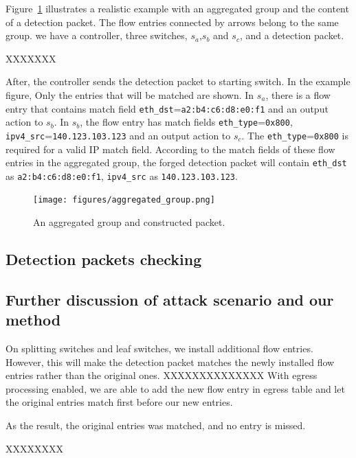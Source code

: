Figure~\ref{aggregated_group} illustrates a realistic example with an aggregated group and the content of a detection packet. The flow entries connected by arrows belong to the same group. we have a controller, three switches, $s_a$,$s_b$ and $s_c$, and a detection packet.

XXXXXXX


After, the controller sends the detection packet to starting switch. In the example figure,  Only the entries that will be matched are shown. In $s_a$, there is a flow entry that contains match field \texttt{eth\_dst}=\texttt{a2:b4:c6:d8:e0:f1} and an output action to $s_b$. In $s_b$, the flow entry has match fields \texttt{eth\_type}=\texttt{0x800}, \texttt{ipv4\_src}=\texttt{140.123.103.123} and an output action to $s_c$. The \texttt{eth\_type}=\texttt{0x800} is required for a valid IP match field. According to the match fields of these flow entries in the aggregated group, the forged detection packet will contain \texttt{eth\_dst} as \texttt{a2:b4:c6:d8:e0:f1}, \texttt{ipv4\_src} as \texttt{140.123.103.123}.  

\begin{figure}[H]
\begin{center}
\texttt{[image: figures/aggregated\_group.png]}
\end{center}
\caption{An aggregated group and constructed packet. }
\label{aggregated_group}
\end{figure}

\subsection{Detection packets checking}

\subsection{Further discussion of attack scenario and our method}
\label{Further_discussion}
On splitting switches and leaf switches, we install additional flow entries. However, this will make the detection packet matches the newly installed flow entries rather than the original ones. XXXXXXXXXXXXXX
With egress processing enabled, we are able to add the new flow entry in egress table and let the original entries match first before our new entries. 


As the result, the original entries was matched, and no entry is missed. 


XXXXXXXX\cite{OF_SPEC_15}

